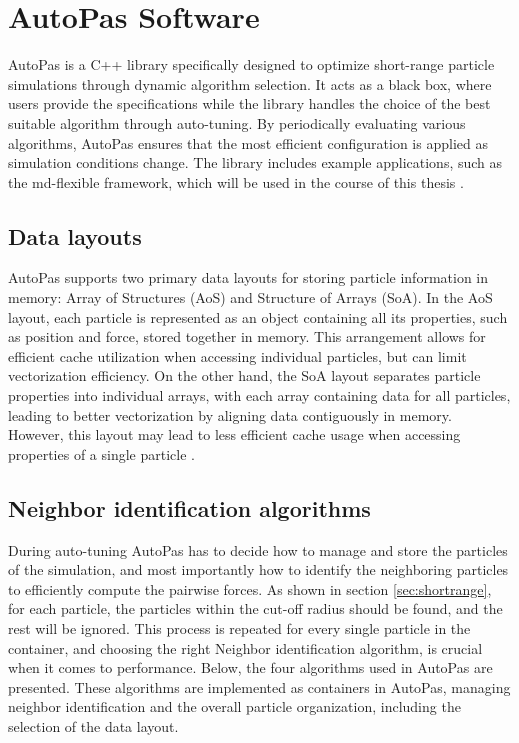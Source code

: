 \section{AutoPas Software}

AutoPas is a C++ library specifically designed to optimize short-range particle simulations through dynamic algorithm selection. It acts as a black box, where users provide the specifications while the library handles the choice of the best suitable algorithm through auto-tuning. By periodically evaluating various algorithms, AutoPas ensures that the most efficient configuration is applied as simulation conditions change. The library includes example applications, such as the md-flexible framework, which will be used in the course of this thesis \parencite{gratl2019autopas}.


\subsection{Data layouts}

AutoPas supports two primary data layouts for storing particle information in memory: Array of Structures (AoS) and Structure of Arrays (SoA). In the AoS layout, each particle is represented as an object containing all its properties, such as position and force, stored together in memory. This arrangement allows for efficient cache utilization when accessing individual particles, but can limit vectorization efficiency. On the other hand, the SoA layout separates particle properties into individual arrays, with each array containing data for all particles, leading to better vectorization by aligning data contiguously in memory. However, this layout may lead to less efficient cache usage when accessing properties of a single particle \parencite{gratl2019autopas}.

\subsection{Neighbor identification algorithms} \label{sec:neighbor_iden_algs}

During auto-tuning AutoPas has to decide how to manage and store the particles of the simulation, and most importantly how to identify the neighboring particles to efficiently compute the pairwise forces. As shown in section \ref{sec:shortrange}, for each particle, the particles within the cut-off radius should be found, and the rest will be ignored. This process is repeated for every single particle in the container, and choosing the right Neighbor identification algorithm, is crucial when it comes to performance. Below, the four algorithms used in AutoPas are presented. These algorithms are implemented as containers in AutoPas, managing neighbor identification and the overall particle organization, including the selection of the data layout. 

